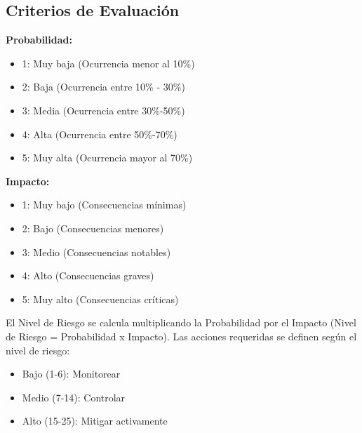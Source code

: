 \subsection{Criterios de Evaluación}
\textbf{Probabilidad:} 
\begin{itemize}
    \item 1: Muy baja (Ocurrencia menor al 10\%)
    \item 2: Baja (Ocurrencia entre 10\% - 30\%)
    \item 3: Media (Ocurrencia entre 30\%-50\%)
    \item 4: Alta (Ocurrencia entre 50\%-70\%) 
    \item 5: Muy alta (Ocurrencia mayor al 70\%) 
\end{itemize}
\textbf{Impacto:} 
\begin{itemize}
    \item 1: Muy bajo (Consecuencias mínimas)
    \item 2: Bajo (Consecuencias menores)
    \item 3: Medio (Consecuencias notables)
    \item 4: Alto (Consecuencias graves)
    \item 5: Muy alto (Consecuencias críticas)
\end{itemize}
El Nivel de Riesgo se calcula multiplicando la Probabilidad por el Impacto (Nivel de Riesgo = Probabilidad x Impacto). Las acciones requeridas se definen según el nivel de riesgo: 
\begin{itemize}
    \item Bajo (1-6): Monitorear
    \item Medio (7-14): Controlar
    \item Alto (15-25): Mitigar activamente
\end{itemize}

